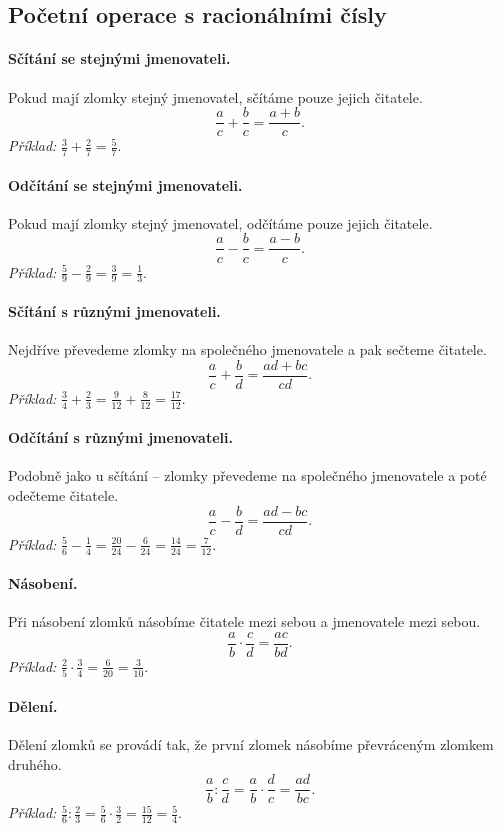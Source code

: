 \documentclass[12pt,a4paper]{article}
\begin{document}
\newpage
\subsection*{Početní operace s racionálními čísly}

\paragraph{Sčítání se stejnými jmenovateli.}  
Pokud mají zlomky stejný jmenovatel, sčítáme pouze jejich čitatele.  
\[
\frac{a}{c} + \frac{b}{c} = \frac{a+b}{c}.
\]  
\textit{Příklad:} $\tfrac{3}{7} + \tfrac{2}{7} = \tfrac{5}{7}$.

\paragraph{Odčítání se stejnými jmenovateli.}  
Pokud mají zlomky stejný jmenovatel, odčítáme pouze jejich čitatele.  
\[
\frac{a}{c} - \frac{b}{c} = \frac{a-b}{c}.
\]  
\textit{Příklad:} $\tfrac{5}{9} - \tfrac{2}{9} = \tfrac{3}{9} = \tfrac{1}{3}$.

\paragraph{Sčítání s různými jmenovateli.}  
Nejdříve převedeme zlomky na společného jmenovatele a pak sečteme čitatele.  
\[
\frac{a}{c} + \frac{b}{d} = \frac{ad+bc}{cd}.
\]  
\textit{Příklad:} $\tfrac{3}{4} + \tfrac{2}{3} = \tfrac{9}{12} + \tfrac{8}{12} = \tfrac{17}{12}$.

\paragraph{Odčítání s různými jmenovateli.}  
Podobně jako u sčítání – zlomky převedeme na společného jmenovatele a poté odečteme čitatele.  
\[
\frac{a}{c} - \frac{b}{d} = \frac{ad-bc}{cd}.
\]  
\textit{Příklad:} $\tfrac{5}{6} - \tfrac{1}{4} = \tfrac{20}{24} - \tfrac{6}{24} = \tfrac{14}{24} = \tfrac{7}{12}$.

\paragraph{Násobení.}  
Při násobení zlomků násobíme čitatele mezi sebou a jmenovatele mezi sebou.  
\[
\frac{a}{b} \cdot \frac{c}{d} = \frac{ac}{bd}.
\]  
\textit{Příklad:} $\tfrac{2}{5} \cdot \tfrac{3}{4} = \tfrac{6}{20} = \tfrac{3}{10}$.

\paragraph{Dělení.}  
Dělení zlomků se provádí tak, že první zlomek násobíme převráceným zlomkem druhého.  
\[
\frac{a}{b} : \frac{c}{d} = \frac{a}{b} \cdot \frac{d}{c} = \frac{ad}{bc}.
\]  
\textit{Příklad:} $\tfrac{5}{6} : \tfrac{2}{3} = \tfrac{5}{6} \cdot \tfrac{3}{2} = \tfrac{15}{12} = \tfrac{5}{4}$.
\end{document}
